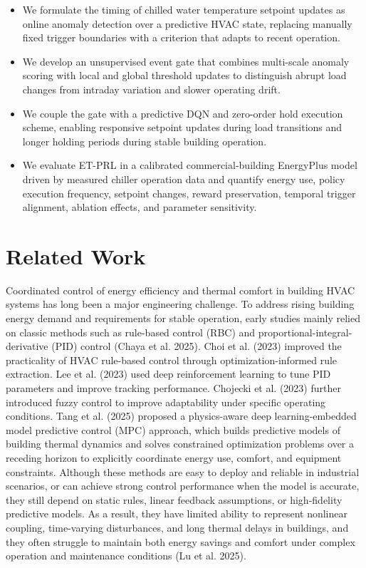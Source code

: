 \documentclass[preprint,12pt]{elsarticle}
\begin{document}
\begin{itemize}
\item
  We formulate the timing of chilled water temperature setpoint updates as online anomaly detection over a predictive HVAC state, replacing manually fixed trigger boundaries with a criterion that adapts to recent operation.
\item
  We develop an unsupervised event gate that combines multi-scale anomaly scoring with local and global threshold updates to distinguish abrupt load changes from intraday variation and slower operating drift.
\item
  We couple the gate with a predictive DQN and zero-order hold execution scheme, enabling responsive setpoint updates during load transitions and longer holding periods during stable building operation.
\item
  We evaluate ET-PRL in a calibrated commercial-building EnergyPlus model driven by measured chiller operation data and quantify energy use, policy execution frequency, setpoint changes, reward preservation, temporal trigger alignment, ablation effects, and parameter sensitivity.
\end{itemize}

\section{Related Work}\label{related-work}

Coordinated control of energy efficiency and thermal comfort in building HVAC systems has long been a major engineering challenge. To address rising building energy demand and requirements for stable operation, early studies mainly relied on classic methods such as rule-based control (RBC) and proportional-integral-derivative (PID) control (Chaya et al. 2025). Choi et al. (2023) improved the practicality of HVAC rule-based control through optimization-informed rule extraction. Lee et al. (2023) used deep reinforcement learning to tune PID parameters and improve tracking performance. Chojecki et al. (2023) further introduced fuzzy control to improve adaptability under specific operating conditions. Tang et al. (2025) proposed a physics-aware deep learning-embedded model predictive control (MPC) approach, which builds predictive models of building thermal dynamics and solves constrained optimization problems over a receding horizon to explicitly coordinate energy use, comfort, and equipment constraints. Although these methods are easy to deploy and reliable in industrial scenarios, or can achieve strong control performance when the model is accurate, they still depend on static rules, linear feedback assumptions, or high-fidelity predictive models. As a result, they have limited ability to represent nonlinear coupling, time-varying disturbances, and long thermal delays in buildings, and they often struggle to maintain both energy savings and comfort under complex operation and maintenance conditions (Lu et al. 2025).
\end{document}
